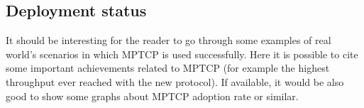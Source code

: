 \subsection{Deployment status}
It should be interesting for the reader to go through some examples of real world's scenarios in which MPTCP is used successfully. Here it is possible to cite some important achievements related to MPTCP (for example the highest throughput ever reached with the new protocol).
If available, it would be also good to show some graphs about MPTCP adoption rate or similar.